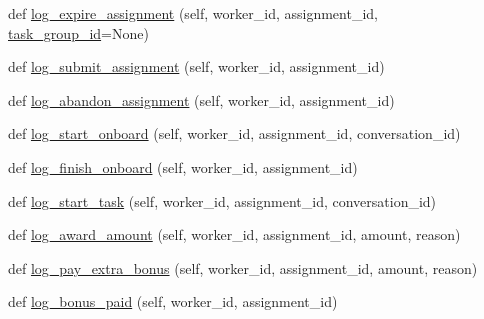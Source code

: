 \begin{DoxyCompactItemize}
\item 
def \hyperlink{classparlai_1_1mturk_1_1core_1_1legacy__2018_1_1mturk__data__handler_1_1MTurkDataHandler_a8327550db89925461a02490e59e99c76}{log\+\_\+expire\+\_\+assignment} (self, worker\+\_\+id, assignment\+\_\+id, \hyperlink{classparlai_1_1mturk_1_1core_1_1legacy__2018_1_1mturk__data__handler_1_1MTurkDataHandler_ab743471dc641c785f93d9c1285967162}{task\+\_\+group\+\_\+id}=None)
\item 
def \hyperlink{classparlai_1_1mturk_1_1core_1_1legacy__2018_1_1mturk__data__handler_1_1MTurkDataHandler_a003f7a51af6ded2072ad521bf7acf0cb}{log\+\_\+submit\+\_\+assignment} (self, worker\+\_\+id, assignment\+\_\+id)
\item 
def \hyperlink{classparlai_1_1mturk_1_1core_1_1legacy__2018_1_1mturk__data__handler_1_1MTurkDataHandler_a6c4a99613bcdcf61126d251f7c5d0f29}{log\+\_\+abandon\+\_\+assignment} (self, worker\+\_\+id, assignment\+\_\+id)
\item 
def \hyperlink{classparlai_1_1mturk_1_1core_1_1legacy__2018_1_1mturk__data__handler_1_1MTurkDataHandler_a203c9543a46716e6e51d4d1e795385f5}{log\+\_\+start\+\_\+onboard} (self, worker\+\_\+id, assignment\+\_\+id, conversation\+\_\+id)
\item 
def \hyperlink{classparlai_1_1mturk_1_1core_1_1legacy__2018_1_1mturk__data__handler_1_1MTurkDataHandler_ad886593bc60aab7174f9aa255f2ab5a5}{log\+\_\+finish\+\_\+onboard} (self, worker\+\_\+id, assignment\+\_\+id)
\item 
def \hyperlink{classparlai_1_1mturk_1_1core_1_1legacy__2018_1_1mturk__data__handler_1_1MTurkDataHandler_a79a42fda72f56a54462c91242fb0852b}{log\+\_\+start\+\_\+task} (self, worker\+\_\+id, assignment\+\_\+id, conversation\+\_\+id)
\item 
def \hyperlink{classparlai_1_1mturk_1_1core_1_1legacy__2018_1_1mturk__data__handler_1_1MTurkDataHandler_aa6003d72e64397b5d7ad10018c9ab1ff}{log\+\_\+award\+\_\+amount} (self, worker\+\_\+id, assignment\+\_\+id, amount, reason)
\item 
def \hyperlink{classparlai_1_1mturk_1_1core_1_1legacy__2018_1_1mturk__data__handler_1_1MTurkDataHandler_a86266f696dc415742c4d1709568a52ff}{log\+\_\+pay\+\_\+extra\+\_\+bonus} (self, worker\+\_\+id, assignment\+\_\+id, amount, reason)
\item 
def \hyperlink{classparlai_1_1mturk_1_1core_1_1legacy__2018_1_1mturk__data__handler_1_1MTurkDataHandler_ad690660ac58d15ce83f0801b999f946e}{log\+\_\+bonus\+\_\+paid} (self, worker\+\_\+id, assignment\+\_\+id)
\item 

\end{DoxyCompactItemize}
